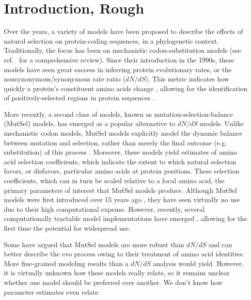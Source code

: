 \documentclass[11pt]{article}
\begin{document}
\section*{Introduction, Rough}

Over the years, a variety of models have been proposed to describe the effects of natural selection on protein-coding sequences, in a phylogenetic context. Traditionally, the focus has been on mechanistic codon-substitution models (see ref.~\cite{Anisimova2009} for a comprehensive review). Since their introduction in the 1990s, these models have seen great success in inferring protein evolutionary rates, or the nonsynonymous/synonymous rate ratio ($dN/dS$). This metric indicates how quickly a protein's constituent amino acids change \cite{GoldmanYang1994, MuseGaut1994, NielsenYang1998}, allowing for the identification of positively-selected regions in protein sequences \cite{ NielsenYang1998,Yangetal2000}. 

More recently, a second class of models, known as mutation-selection-balance (MutSel) models, has emerged as a popular alternative to $dN/dS$ models. Unlike mechanistic codon models, MutSel models explicitly model the dynamic balance between mutation and selection, rather than merely the final outcome (e.g. substitution) of this process \cite{HalpernBruno1998, YangNielsen2008, Rodrigueetal2010, Tamurietal2012}. Moreover, these models yield estimates of amino acid selection coefficients, which indicate the extent to which natural selection favors, or disfavors, particular amino acids at protein positions. These selection coefficients, which can in turn be scaled relative to a focal amino acid, the primary parameters of interest that MutSel models produce. Although MutSel models were first introduced over 15 years ago \cite{HalpernBruno1998}, they have seen virtually no use due to their high computational expense. However, recently, several computationally tractable model implementations have emerged \cite{RodrigueLartillot2014,Tamurietal2014}, allowing for the first time the potential for widespread use. 

Some have argued that MutSel models are more robust than $dN/dS$ and can better describe the evo process owing to their treatment of amino acid identities. More fine-grained modeling results than a $dN/dS$ analysis would yield. However, it is virtually unknown how these models really relate, so it remains unclear whether one model should be preferred over another. We don't know how parameter estimates even relate.
\end{document}
